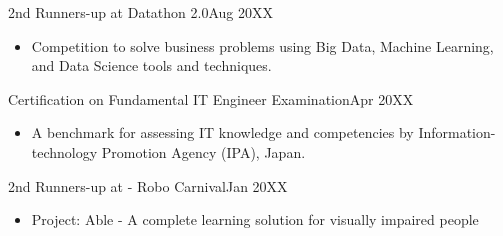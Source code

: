   \customSubHeadingContentStart
  
    \customSubHeading
      {2nd Runners-up at Datathon 2.0}{Aug 20XX}
      \begin{itemize}[itemsep=-3pt, left=0pt]
        \item {Competition to solve business problems using Big Data, Machine Learning, and Data Science tools and techniques.}
    \end{itemize}
    \vspace{-10pt}
      
    \customSubHeading
      {Certification on Fundamental IT Engineer Examination}{Apr 20XX}
     \begin{itemize}[itemsep=-3pt, left=0pt]
        \item{ A benchmark for assessing IT knowledge and competencies by Information-technology Promotion Agency (IPA), Japan.}
    \end{itemize}
    \vspace{-10pt}

    \customSubHeading
      {2nd Runners-up at - Robo Carnival}{Jan 20XX}
    \begin{itemize}[itemsep=-3pt, left=0pt]
        \item{Project: Able - A complete learning solution for visually impaired people }
    \end{itemize}
    \vspace{-10pt}

  \customSubHeadingContentEnd
\vspace{-6pt}